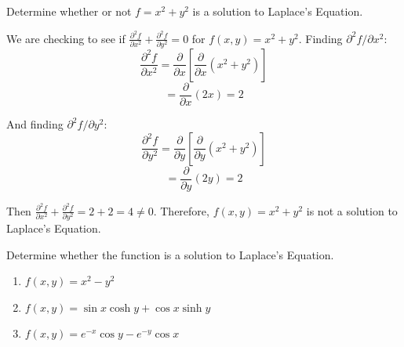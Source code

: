 \begin{Worked}
\begin{Problem}
Determine whether or not $f = x^2 + y^2$ is a solution to 
Laplace's Equation. 
\end{Problem}
\begin{Solution}
We are checking to see if $\frac{\partial^2 f}{\partial 
x^2} + \frac{\partial^2 f}{\partial y^2} = 0$ for $f(x, y) = x^2 + y^2$. 
Finding $\partial^2 f / \partial x^2$:
$$\frac{\partial^2 f}{\partial x^2} = \frac{\partial}{\partial x} \left[ \frac{
\partial}{\partial x} \left( x^2 + y^2 \right) \right]$$
$$= \frac{\partial}{\partial x} \left( 2x \right) = 2$$

And finding $\partial^2 f / \partial y^2$:
$$\frac{\partial^2 f}{\partial y^2} = \frac{\partial}{\partial y} \left[ \frac{
\partial}{\partial y} \left( x^2 + y^2 \right) \right]$$
$$= \frac{\partial}{\partial y} \left( 2y \right) = 2$$

Then $\frac{\partial^2 f}{\partial x^2} + \frac{\partial^2 f}{\partial y^2} = 
2 + 2 = 4 \neq 0$. Therefore, $f(x, y) = x^2 + y^2$ is not a solution to 
Laplace's Equation. 
\end{Solution}
\end{Worked}

\begin{Exercise}[title = {Solutions to Laplace's Equation}, label = laplace]
Determine whether the function is a solution to Laplace's Equation. 
\begin{enumerate}
    \item $f(x, y) = x^2 - y^2$
    \item $f(x, y) = \sin{x} \cosh{y} + \cos{x} \sinh{y}$
    \item $f(x, y) = e^{-x} \cos{y} - e^{-y} \cos{x}$
\end{enumerate}
\end{Exercise}


